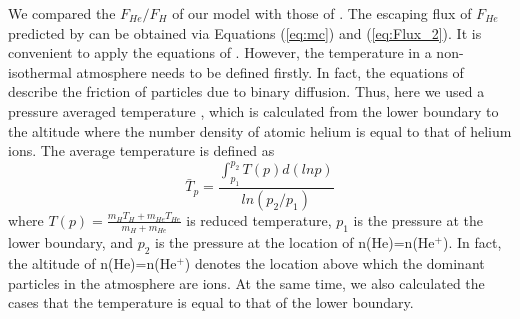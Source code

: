 \documentclass[journal, onecolumn]{aastex631}
\begin{document}
\begin{CJK*}{UTF8}{gbsn}
We compared the $F_{He}/F_{H}$ of our model with those of \cite{Hunten1987}. The escaping flux of $F_{He}$ predicted by \cite{Hunten1987} can be obtained via Equations (\ref{eq:mc}) and (\ref{eq:Flux_2}). It is convenient to apply the equations of \cite{Hunten1987}. However, the temperature in a non-isothermal atmosphere needs to be defined firstly. In fact, the equations of \cite{Hunten1987} describe the friction of particles due to binary diffusion. Thus, here we used a pressure averaged temperature \citep{Koskinen2013}, which is calculated from the lower boundary to the altitude where the number density of atomic helium is equal to that of helium ions. The average temperature is defined as
\begin{equation}\label{eq:ave_tmp}
\bar{T}_{p}=\frac{\int^{p_{2}}_{p_{1}}T(p)d(lnp)}{ln(p_{2}/p_{1})}
\end{equation}
where $T(p) = \frac{m_HT_H+m_{He}T_{He}}{m_H+m_{He}}$ is reduced temperature, $p_1$ is the pressure at the lower boundary, and $p_2$ is the pressure at the location of n(He)=n(He$^{+}$). In fact, the altitude of n(He)=n(He$^{+}$) denotes the location above which the dominant particles in the atmosphere are ions. At the same time, we also calculated the cases that the temperature is equal to that of the lower boundary.


\end{CJK*}
\end{document}
